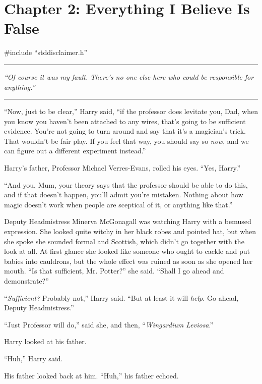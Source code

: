 \chapter{Chapter 2: Everything I Believe Is False}
\#include ``stddisclaimer.h''

\begin{center}\rule{3in}{0.4pt}\end{center}

\emph{``Of course it was my fault. There's no one else here who could be responsible for anything.''}

\begin{center}\rule{3in}{0.4pt}\end{center}

``Now, just to be clear,'' Harry said, ``if the professor does levitate you, Dad, when you know you haven't been attached to any wires, that's going to be sufficient evidence. You're not going to turn around and say that it's a magician's trick. That wouldn't be fair play. If you feel that way, you should say so \emph{now}, and we can figure out a different experiment instead.''

Harry's father, Professor Michael Verres-Evans, rolled his eyes. ``Yes, Harry.''

``And you, Mum, your theory says that the professor should be able to do this, and if that doesn't happen, you'll admit you're mistaken. Nothing about how magic doesn't work when people are sceptical of it, or anything like that.''

Deputy Headmistress Minerva McGonagall was watching Harry with a bemused expression. She looked quite witchy in her black robes and pointed hat, but when she spoke she sounded formal and Scottish, which didn't go together with the look at all. At first glance she looked like someone who ought to cackle and put babies into cauldrons, but the whole effect was ruined as soon as she opened her mouth. ``Is that sufficient, Mr. Potter?'' she said. ``Shall I go ahead and demonstrate?''

``\emph{Sufficient?} Probably not,'' Harry said. ``But at least it will \emph{help.} Go ahead, Deputy Headmistress.''

``Just Professor will do,'' said she, and then, ``\emph{Wingardium Leviosa}.''

Harry looked at his father.

``Huh,'' Harry said.

His father looked back at him. ``Huh,'' his father echoed.

